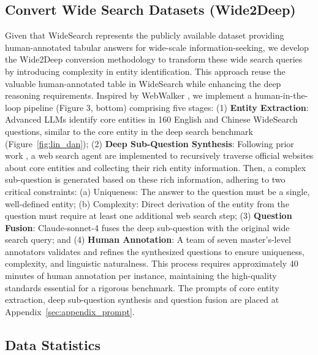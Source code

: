 \documentclass[11pt, letterpaper, logo, onecolumn, copyright, numbering]{paper_improved}
\let\cite\citep
\begin{document}
\subsection{Convert Wide Search Datasets (Wide2Deep) \label{sec:convert_wide_search}}

Given that WideSearch \cite{wong2025widesearch} represents the publicly available dataset providing human-annotated tabular answers for wide-scale information-seeking, we develop the Wide2Deep conversion methodology to transform these wide search queries by introducing complexity in entity identification. This approach reuse the valuable human-annotated table in WideSearch while enhancing the deep reasoning requirements. Inspired by WebWalker \cite{wu2025webwalkerbenchmarkingllmsweb}, we implement a human-in-the-loop pipeline (Figure 3, bottom) comprising five stages: (1) \textbf{Entity Extraction}: Advanced LLMs identify core entities in 160 English and Chinese WideSearch questions, similar to the core entity in the deep search benchmark (Figure~\ref{fig:lin_dan}); 
(2) \textbf{Deep Sub-Question Synthesis}: Following prior work \cite{li2025websailor,tao2025webshaper}, a web search agent are implemented to recursively traverse official websites about core entities and collecting their rich entity information. Then, a complex sub-question is generated based on these rich information, adhering to two critical constraints: (a) Uniqueness: The answer to the question must be a single, well-defined entity; (b) Complexity: Direct derivation of the entity from the question must require at least one additional web search step;
(3) \textbf{Question Fusion}: Claude-sonnet-4 fuses the deep sub-question with the original wide search query; and (4) \textbf{Human Annotation}: A team of seven master's-level annotators validates and refines the synthesized questions to ensure uniqueness, complexity, and linguistic naturalness. This process requires approximately 40 minutes of human annotation per instance, maintaining the high-quality standards essential for a rigorous benchmark.
The prompts of core entity extraction, deep sub-question synthesis and question fusion are placed at Appendix~\ref{sec:appendix_prompt}.

\subsection{Data Statistics}
\end{document}
